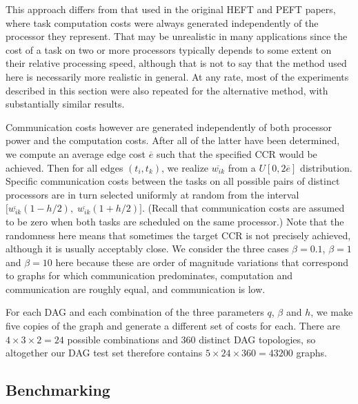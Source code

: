 \documentclass[12pt]{article}
\begin{document}
This approach differs from that used in the original HEFT \cite{topcuoglu2002performance} and PEFT \cite{arabnejad14} papers, where task computation costs were always generated independently of the processor they represent. That may be unrealistic in many applications since the cost of a task on two or more processors typically depends to some extent on their relative processing speed, although that is not to say that the method used here is necessarily more realistic in general. At any rate, most of the experiments described in this section were also repeated for the alternative method, with substantially similar results.

Communication costs however are generated independently of both processor power and the computation costs. After all of the latter have been determined, we compute an average edge cost $\overline{e}$ such that the specified CCR would be achieved. Then for all edges $(t_i, t_k)$, we realize $\overline{w_{ik}}$ from a $U[0, 2\overline{e}]$ distribution. Specific communication costs between the tasks on all possible pairs of distinct processors are in turn selected uniformly at random from the interval $\big[ \overline{w_{ik}} (1 - h/2), \; \overline{w_{ik}} (1 + h/2)   \big]$.
(Recall that communication costs are assumed to be zero when both tasks are scheduled on the same processor.) Note that the randomness here means that sometimes the target CCR is not precisely achieved, although it is usually acceptably close. We consider the three cases $\beta = 0.1$, $\beta = 1$ and $\beta = 10$ here because these are order of magnitude variations that correspond to graphs for which communication predominates, computation and communication are roughly equal, and communication is low.   

For each DAG and each combination of the three parameters $q$, $\beta$ and $h$, we make five copies of the graph and generate a different set of costs for each. There are $4 \times 3 \times 2 = 24$ possible combinations and $360$ distinct DAG topologies, so altogether our DAG test set therefore contains $5 \times 24 \times 360 = 43200$ graphs. 


\subsection{Benchmarking}
\label{subsect.benchmarking}
\end{document}
